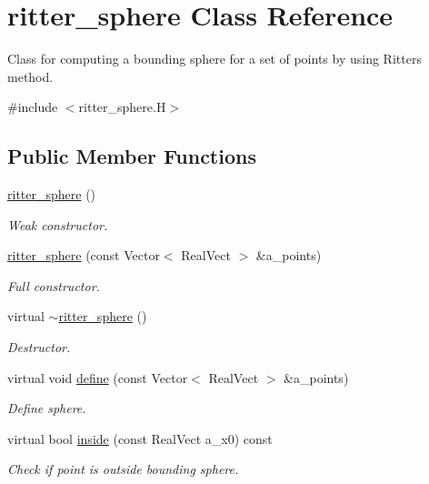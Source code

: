 \hypertarget{classritter__sphere}{}\section{ritter\+\_\+sphere Class Reference}
\label{classritter__sphere}


Class for computing a bounding sphere for a set of points by using Ritter\textquotesingle{}s method.  




{\ttfamily \#include $<$ritter\+\_\+sphere.\+H$>$}

\subsection*{Public Member Functions}
\begin{DoxyCompactItemize}
\item 
\hyperlink{classritter__sphere_a6342235cc1452c0ae1bea5d99972d1de}{ritter\+\_\+sphere} ()
\begin{DoxyCompactList}\small\item\em Weak constructor. \end{DoxyCompactList}\item 
\hyperlink{classritter__sphere_a75176cc759f10231503712d213e469f2}{ritter\+\_\+sphere} (const Vector$<$ Real\+Vect $>$ \&a\+\_\+points)
\begin{DoxyCompactList}\small\item\em Full constructor. \end{DoxyCompactList}\item 
virtual \hyperlink{classritter__sphere_a6f4e92cd5be29530c42d45ff120c7046}{$\sim$ritter\+\_\+sphere} ()
\begin{DoxyCompactList}\small\item\em Destructor. \end{DoxyCompactList}\item 
virtual void \hyperlink{classritter__sphere_adbc4a53b38f231edf645e6e97723f40c}{define} (const Vector$<$ Real\+Vect $>$ \&a\+\_\+points)
\begin{DoxyCompactList}\small\item\em Define sphere. \end{DoxyCompactList}\item 
virtual bool \hyperlink{classritter__sphere_ae4471c1263fa687358b490063db4df47}{inside} (const Real\+Vect a\+\_\+x0) const 
\begin{DoxyCompactList}\small\item\em Check if point is outside bounding sphere. \end{DoxyCompactList}\item 

\end{DoxyCompactItemize}
